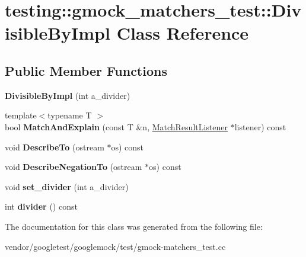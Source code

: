 \hypertarget{classtesting_1_1gmock__matchers__test_1_1_divisible_by_impl}{}\section{testing\+:\+:gmock\+\_\+matchers\+\_\+test\+:\+:Divisible\+By\+Impl Class Reference}
\label{classtesting_1_1gmock__matchers__test_1_1_divisible_by_impl}
\subsection*{Public Member Functions}
\begin{DoxyCompactItemize}
\item 
\mbox{\label{classtesting_1_1gmock__matchers__test_1_1_divisible_by_impl_aab5d8d383a8cbf112fe087c4f0f3f699}} 
{\bfseries Divisible\+By\+Impl} (int a\+\_\+divider)
\item 
\mbox{\label{classtesting_1_1gmock__matchers__test_1_1_divisible_by_impl_a2621df4b34315b327e20b6f4d901417d}} 
{\footnotesize template$<$typename T $>$ }\\bool {\bfseries Match\+And\+Explain} (const T \&n, \hyperlink{classtesting_1_1_match_result_listener}{Match\+Result\+Listener} $\ast$listener) const
\item 
\mbox{\label{classtesting_1_1gmock__matchers__test_1_1_divisible_by_impl_aabd14d5f96ef6851141d9ed9fbee3f86}} 
void {\bfseries Describe\+To} (ostream $\ast$os) const
\item 
\mbox{\label{classtesting_1_1gmock__matchers__test_1_1_divisible_by_impl_a9c061ef411c126c604d4c33d92911d50}} 
void {\bfseries Describe\+Negation\+To} (ostream $\ast$os) const
\item 
\mbox{\label{classtesting_1_1gmock__matchers__test_1_1_divisible_by_impl_a86c8787ab835bc84a9ad7e3931d644cc}} 
void {\bfseries set\+\_\+divider} (int a\+\_\+divider)
\item 
\mbox{\label{classtesting_1_1gmock__matchers__test_1_1_divisible_by_impl_afaf102bc25623966dd11805b62e42321}} 
int {\bfseries divider} () const
\end{DoxyCompactItemize}


The documentation for this class was generated from the following file\+:\begin{DoxyCompactItemize}
\item 
vendor/googletest/googlemock/test/gmock-\/matchers\+\_\+test.\+cc\end{DoxyCompactItemize}
